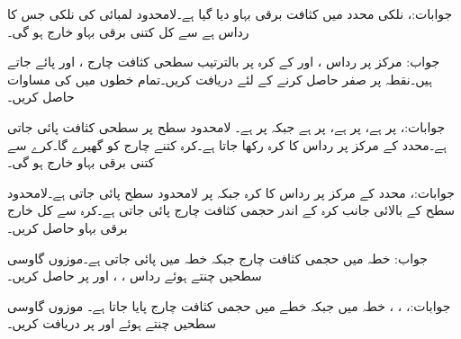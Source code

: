 جوابات:، 
نلکی محدد میں کثافت برقی بہاو  دیا گیا ہے۔لامحدود لمبائی کی نلکی جس کا رداس  ہے سے کل کتنی برقی بہاو خارج ہو گی۔

جواب:
مرکز پر رداس ،  اور  کے کرہ پر بالترتیب سطحی کثافت چارج ، 
 اور  پائے جاتے ہیں۔نقطہ  پر صفر  حاصل کرنے کے لئے  دریافت کریں۔تمام خطوں میں  کی مساوات حاصل کریں۔  

جوابات:،  پر  ہے،  پر  ہے، پر  ہے جبکہ  پر  ہے۔
لامحدود سطح  پر  سطحی کثافت پائی جاتی ہے۔محدد کے مرکز پر  رداس کا کرہ رکھا جاتا ہے۔کرہ کتنے چارج کو گھیرے گا۔کرے سے کتنی برقی بہاو خارج ہو گی۔

جوابات:، 
محدد کے مرکز پر  رداس کا کرہ جبکہ  پر لامحدود سطح پائی جاتی ہے۔لامحدود سطح کے بالائی جانب کرہ کے اندر  حجمی کثافت
 چارج  پائی جاتی ہے۔کرہ سے کل خارج برقی بہاو حاصل کریں۔

جواب: 
خطہ  میں حجمی کثافت چارج  جبکہ
 خطہ  میں  پائی جاتی ہے۔موزوں گاوسی سطحیں چنتے ہوئے رداس ، ،  اور  پر  حاصل کریں۔

جوابات:، ، ، 
خطہ  میں  جبکہ  خطے میں  حجمی کثافت چارج پایا جاتا ہے۔ موزوں گاوسی سطحیں چنتے
 ہوئے   اور  پر  دریافت کریں۔

